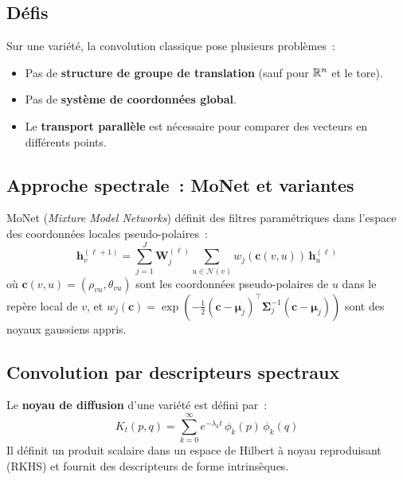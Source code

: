 \subsection{D\'efis}

Sur une vari\'et\'e, la convolution classique pose plusieurs probl\`emes~:
\begin{itemize}
    \item Pas de \textbf{structure de groupe de translation} (sauf pour $\mathbb{R}^n$
          et le tore).
    \item Pas de \textbf{syst\`eme de coordonn\'ees global}.
    \item Le \textbf{transport parall\`ele} est n\'ecessaire pour comparer des
          vecteurs en diff\'erents points.
\end{itemize}

\subsection{Approche spectrale~: MoNet et variantes}

\begin{definition}
MoNet (\textit{Mixture Model Networks}) d\'efinit des filtres
param\'etriques dans l'espace des coordonn\'ees locales pseudo-polaires~:
\[
    \mathbf{h}_v^{(\ell+1)} = \sum_{j=1}^{J} \mathbf{W}_j^{(\ell)}
    \sum_{u \in \mathcal{N}(v)} w_j(\mathbf{c}(v, u))\, \mathbf{h}_u^{(\ell)}
\]
o\`u $\mathbf{c}(v, u) = (\rho_{vu}, \theta_{vu})$ sont les coordonn\'ees
pseudo-polaires de $u$ dans le rep\`ere local de $v$, et
$w_j(\mathbf{c}) = \exp\!\left(-\frac{1}{2}(\mathbf{c} - \boldsymbol{\mu}_j)^\top
\boldsymbol{\Sigma}_j^{-1}(\mathbf{c} - \boldsymbol{\mu}_j)\right)$
sont des noyaux gaussiens appris.
\end{definition}

\subsection{Convolution par descripteurs spectraux}

\begin{definition}
Le \textbf{noyau de diffusion} d'une vari\'et\'e est d\'efini par~:
\[
    K_t(p, q) = \sum_{k=0}^{\infty} e^{-\lambda_k t}\, \phi_k(p)\, \phi_k(q)
\]
Il d\'efinit un produit scalaire dans un espace de Hilbert \`a noyau reproduisant
(RKHS) et fournit des descripteurs de forme intrins\`eques.
\end{definition}

